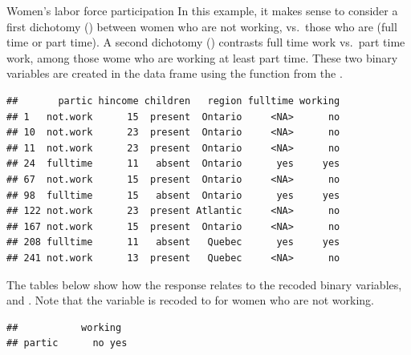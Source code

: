 \documentclass[11pt]{book}
\renewenvironment{knitrout}{\small\renewcommand{\baselinestretch}{.85}}{} %
\begin{document}
\begin{Example}[wlfpart1]{Women's labor force participation}
In this example, it makes sense to consider a first dichotomy
()
between women who are not working, vs.\ those who are
(full time or part time).
A second dichotomy () contrasts
full time work vs.\ part time work, among those wome who are 
working at least part time.
These two binary variables are created in the data frame
using the  function from the .
\begin{knitrout}
\color{fgcolor}\begin{kframe}
\begin{alltt}
 \hlkwb{<-} 
   \hlkwb{<-}   \hlstd{)}
   \hlkwb{<-} 
    \hlstd{)\})}
\end{alltt}
\begin{verbatim}
##       partic hincome children   region fulltime working
## 1   not.work      15  present  Ontario     <NA>      no
## 10  not.work      23  present  Ontario     <NA>      no
## 11  not.work      23  present  Ontario     <NA>      no
## 24  fulltime      11   absent  Ontario      yes     yes
## 67  not.work      15  present  Ontario     <NA>      no
## 98  fulltime      15   absent  Ontario      yes     yes
## 122 not.work      23  present Atlantic     <NA>      no
## 167 not.work      15  present  Ontario     <NA>      no
## 208 fulltime      11   absent   Quebec      yes     yes
## 241 not.work      13  present   Quebec     <NA>      no
\end{verbatim}
\end{kframe}
\end{knitrout}
The tables below show how
the response  relates to the recoded binary
variables,  and .
Note that the  variable is recoded to 
for women who are not working.  
\begin{knitrout}
\color{fgcolor}\begin{kframe}
\begin{alltt}
 
\end{alltt}
\begin{verbatim}
##           working
## partic      no yes

\end{verbatim}
\end{kframe}
\end{knitrout}
\end{Example}
\end{document}
